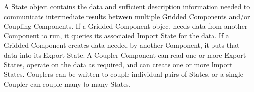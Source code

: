 %


A State object contains the data and sufficient
description information needed to communicate intermediate results
between multiple Gridded Components and/or Coupling Components.
If a Gridded Component object needs data
from another Component to run, it queries its associated
Import State for the data.  If a Gridded Component creates data
needed by another Component, it puts that data into its
Export State.  A Coupler Component can read one or more Export States,
operate on the data as required, and can create one or more Import States.
Couplers can be written to couple individual pairs of States, or
a single Coupler can couple many-to-many States.

 
